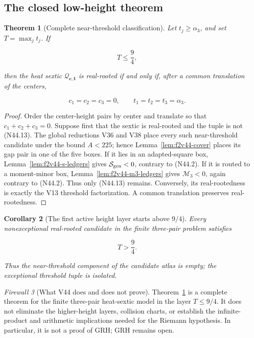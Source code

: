 \documentclass[11pt]{article}
\newtheorem{theorem}{Theorem}[section]
\newtheorem{corollary}[theorem]{Corollary}
\theoremstyle{definition}
\theoremstyle{remark}
\newtheorem{firewall}[theorem]{Firewall}
\begin{document}
\subsection{The closed low-height theorem}

\begin{theorem}[Complete near-threshold classification]
\label{thm:f2v44-near-threshold}
Let \(t_j\geq\alpha_3\), and set \(T=\max_jt_j\).  If

\[
 T\leq\frac94,
\tag{N44.12}
\]

then the heat sextic \(\mathcal Q_{\bm c,\bm t}\) is real-rooted if and
only if, after a common translation of the centers,

\[
 c_1=c_2=c_3=0,\qquad t_1=t_2=t_3=\alpha_3.
\tag{N44.13}
\]
\end{theorem}

\begin{proof}
Order the center-height pairs by center and translate so that
\(c_1+c_2+c_3=0\).  Suppose first that the sextic is real-rooted and the
tuple is not \textup{(N44.13)}.  The global reductions V36 and V38 place every
such near-threshold candidate under the bound \(A<225\); hence
Lemma~\ref{lem:f2v44-cover} places its gap pair in one of the five boxes.
If it lies in an adapted-square box,
Lemma~\ref{lem:f2v44-s-ledgers} gives
\(\mathcal S_{\rm gen}<0\), contrary to \textup{(N44.2)}.  If it is routed to a
moment-minor box, Lemma~\ref{lem:f2v44-m3-ledgers} gives
\(\mathcal M_3<0\), again contrary to \textup{(N44.2)}.  Thus only \textup{(N44.13)}
remains.  Conversely, its real-rootedness is exactly the V13 threshold
factorization.  A common translation preserves real-rootedness.
\end{proof}

\begin{corollary}[The first active height layer starts above \(9/4\)]
\label{cor:f2v44-low-chart}
Every nonexceptional real-rooted candidate in the finite three-pair
problem satisfies

\[
 \boxed{T>\frac94.}
\tag{N44.14}
\]

Thus the near-threshold component of the candidate atlas is empty; the
exceptional threshold tuple is isolated.
\end{corollary}

\begin{firewall}[What V44 does and does not prove]
\label{fire:f2v44}
Theorem~\ref{thm:f2v44-near-threshold} is a complete theorem for the
finite three-pair heat-sextic model in the layer \(T\leq9/4\).  It does
not eliminate the higher-height layers, collision charts, or establish
the infinite-product and arithmetic implications needed for the
Riemann hypothesis.  In particular, it is not a proof of GRH; GRH
remains open.
\end{firewall}
\end{document}
